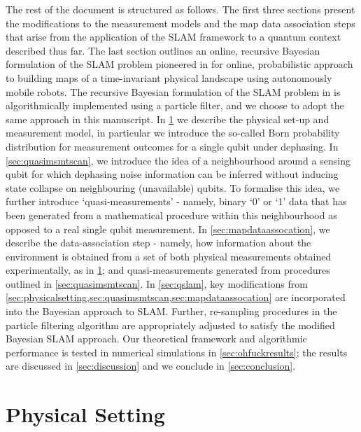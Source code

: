 The rest of the document is structured as follows. The first three sections present the modifications to the measurement models and the map data association steps that arise from the application of the SLAM framework to a quantum context described thus far. The last section outlines an online, recursive Bayesian formulation of the SLAM problem pioneered in \cite{thrun2001probabilistic} for online, probabilistic approach to building maps of a time-invariant physical landscape  using autonomously mobile robots. The recursive Bayesian formulation of the SLAM problem in \cite{thrun2001probabilistic} is algorithmically implemented using a particle filter, and we choose to adopt the same approach in this manuscript.  In \cref{sec:physicalsetting} we describe the physical set-up and measurement model, in particular we introduce the so-called Born probability distribution for measurement outcomes for a single qubit under dephasing. In \cref{sec:quasimsmtscan}, we introduce the idea of a neighbourhood around a sensing qubit for which dephasing noise information can be inferred without inducing state collapse on neighbouring (unavailable) qubits. To formalise this idea, we further introduce `quasi-measurements' - namely, binary `0' or `1' data that has been generated from a mathematical procedure within this neighbourhood as opposed to a real single qubit measurement. In \cref{sec:mapdataassocation}, we describe the data-association step - namely, how information about the environment is obtained from a set of both physical measurements obtained experimentally, as in \cref{sec:physicalsetting}; and quasi-measurements generated from procedures outlined in \cref{sec:quasimsmtscan}. In \cref{sec:qslam}, key modifications from \cref{sec:physicalsetting,sec:quasimsmtscan,sec:mapdataassocation} are incorporated into the Bayesian approach to SLAM. Further, re-sampling procedures in the particle filtering algorithm are appropriately adjusted to satisfy the modified Bayesian SLAM approach. Our theoretical framework and algorithmic performance is tested in numerical simulations in \cref{sec:ohfuckresults}; the results are discussed in \cref{sec:discussion} and we conclude in \cref{sec:conclusion}.
\\
\section{Physical Setting}\label{sec:physicalsetting}

